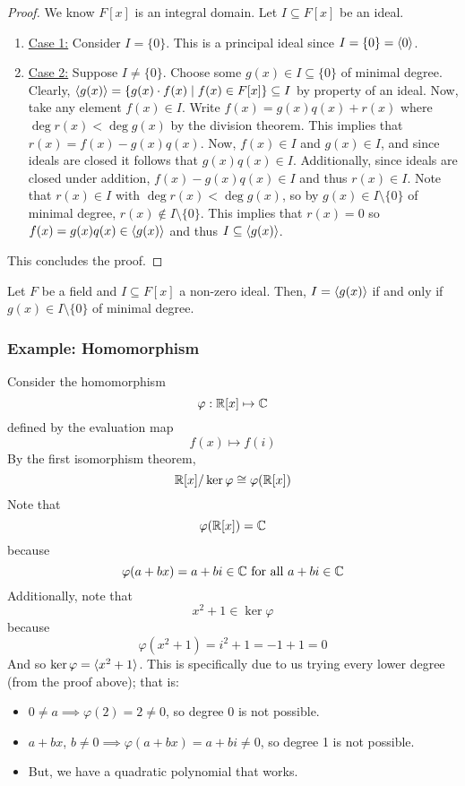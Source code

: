 \documentclass[letterpaper]{article}
\begin{document}
\begin{mdframed}[]
    \begin{proof}
        We know $F[x]$ is an integral domain. Let $I \subseteq F[x]$ be an ideal. 
        \begin{enumerate}
            \item \underline{Case 1:} Consider $I = \{0\}$. This is a principal ideal since $I = \{0\} = \langle 0 \rangle$. 
            \item \underline{Case 2:} Suppose $I \neq \{0\}$. Choose some $g(x) \in I \subseteq \{0\}$ of minimal degree. Clearly, $\langle g(x) \rangle = \{g(x) \cdot f(x) \mid f(x) \in F[x]\} \subseteq I$ by property of an ideal. Now, take any element $f(x) \in I$. Write $f(x) = g(x) q(x) + r(x)$ where $\deg r(x) < \deg g(x)$ by the division theorem. This implies that $r(x) = f(x) - g(x) q(x)$. Now, $f(x) \in I$ and $g(x) \in I$, and since ideals are closed it follows that $g(x) q(x) \in I$. Additionally, since ideals are closed under addition, $f(x) - g(x) q(x) \in I$ and thus $r(x) \in I$. Note that $r(x) \in I$ with $\deg r(x) < \deg g(x)$, so by $g(x) \in I \setminus \{0\}$ of minimal degree, $r(x) \notin I \setminus \{0\}$. This implies that $r(x) = 0$ so $f(x) = g(x) q(x) \in \langle g(x) \rangle$ and thus $I \subseteq \langle g(x) \rangle$. 
        \end{enumerate}
        This concludes the proof. 
    \end{proof}
\end{mdframed}

\begin{corollary}{}{}
    Let $F$ be a field and $I \subseteq F[x]$ a non-zero ideal. Then, $I = \langle g(x) \rangle$ if and only if $g(x) \in I \setminus \{0\}$ of minimal degree. 
\end{corollary}

\subsubsection{Example: Homomorphism}
Consider the homomorphism
\[\varphi: \mathbb{R}[x] \mapsto \mathbb{C}\]
defined by the evaluation map 
\[f(x) \mapsto f(i)\]
By the first isomorphism theorem, 
\[\mathbb{R}[x] / \ker \varphi \cong \varphi(\mathbb{R}[x])\]
Note that 
\[\varphi(\mathbb{R}[x]) = \mathbb{C}\]
because 
\[\varphi(a + bx) = a + bi \in \mathbb{C} \text{ for all } a + bi \in \mathbb{C}\]
Additionally, note that 
\[x^2 + 1 \in \ker \varphi\]
because 
\[\varphi(x^2 + 1) = i^2 + 1 = -1 + 1 = 0\]
And so $\ker \varphi = \langle x^2 + 1 \rangle$. This is specifically due to us trying every lower degree (from the proof above); that is: 
\begin{itemize}
    \item $0 \neq a \implies \varphi(2) = 2 \neq 0$, so degree 0 is not possible. 
    \item $a + bx$, $b \neq 0 \implies \varphi(a + bx) = a + bi \neq 0$, so degree 1 is not possible. 
    \item But, we have a quadratic polynomial that works. 
\end{itemize}
\end{document}
